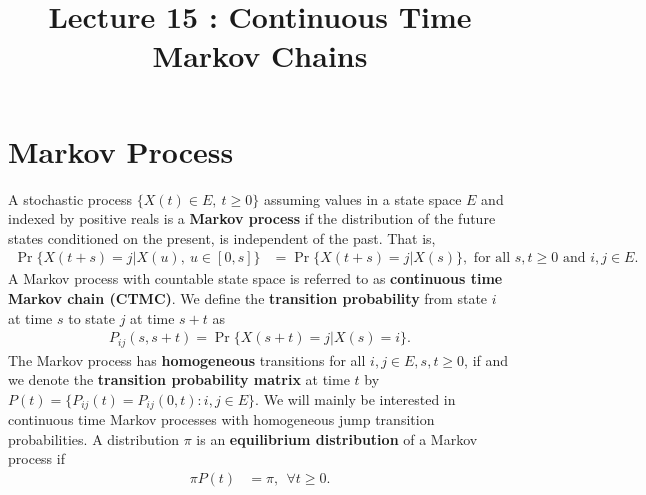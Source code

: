 \documentclass[a4paper,10pt,english]{article}
\title{Lecture 15 : Continuous Time Markov Chains}
\author{}
\begin{document}
\maketitle

\section{Markov Process}
A stochastic process $\{X(t) \in E, ~ t \geqslant 0\}$ assuming values in a state space $E$ and 
indexed by positive reals is a \textbf{Markov process} if 
the distribution of the future states conditioned on the present, is independent of the past. 
That is,
\begin{align*}
\Pr\{X(t+s) = j |X(u),~ u \in [0,s]\} &= \Pr\{X(t+s) = j |X(s)\}, \text{ for all } s, t \geqslant 0 \text{ and } i, j \in E.
\end{align*} 
A Markov process with countable state space is referred to as \textbf{continuous time Markov chain (CTMC)}. 
We define the \textbf{transition probability} from state $i$ at time $s$ to state $j$ at time $s+t$ as 
\begin{align*}
P_{ij}(s, s+t) = \Pr\{X(s+t) = j | X(s) = i\}.
\end{align*}
The Markov process has \textbf{homogeneous} transitions for all $i,j \in E, s,t \geqslant 0$, if
and we denote the \textbf{transition probability matrix} at time $t$ by $P(t) = \{P_{ij}(t) = P_{ij}(0,t): i, j \in E\}$. 
We will mainly be interested in continuous time Markov processes with homogeneous jump transition probabilities. 
A distribution $\pi$ is an \textbf{equilibrium distribution} of a Markov process if
\begin{align*}
\pi P(t) &= \pi,~~ \forall t \geqslant 0. 
\end{align*}
\end{document}
